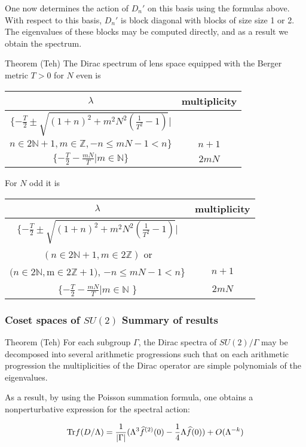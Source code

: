 \documentclass{beamer}
\def\N{{\mathbb N}}
\def\Z{{\mathbb Z}}
\def\Tr{{\rm Tr}}
\begin{document}
\begin{frame}
One now determines the action of $D_n'$ on this basis using the formulas above. With respect to this basis, $D_n'$ is block diagonal with blocks of size size 1 or 2. The eigenvalues of these blocks may be computed directly, and as a result we obtain the spectrum.
\end{frame}

\begin{frame}
\begin{block}{Theorem (Teh)}
	The Dirac spectrum of lens space equipped with the Berger metric $T>0$ for $N$ even is
	
	\begin{tabular}{|c|c|}
\hline
$\lambda$ & multiplicity\\
\hline
$\{ -\frac{T}{2} \pm  \sqrt{(1+n)^2 + m^2 N^2\left(\frac{1}{T^2} - 1 \right)} |$    & \\
$n \in 2\N +1, m\in \Z, -n \leq mN-1 < n \}$ & $n+1$\\
\hline
$\{ -\frac{T}{2} -\frac{mN}{T} | m \in \N \}$ & $2mN$ \\
\hline
\end{tabular}

For $N$ odd it is
\begin{tabular}{|c|c|}
\hline
$\lambda$ & multiplicity\\
\hline
$\{ -\frac{T}{2} \pm  \sqrt{(1+n)^2 + m^2 N^2\left(\frac{1}{T^2} - 1 \right)}|$ & \\ $(n \in 2 \N +1, m \in 2\Z)$ \rm{or}  & \\$(n \in 2\N, $m$ \in 2\Z + 1)$, $-n \leq mN-1 < n \}$  &$ n+1$\\
\hline
$\{ -\frac{T}{2} -\frac{mN}{T}| m \in \N$ \}  & $2mN$ \\
\hline
\end{tabular}
\end{block} 
\end{frame}

\begin{frame}
  \frametitle{Coset spaces of $SU(2)$ Summary of results}
  \begin{block}{Theorem (Teh)}
    For each subgroup $\Gamma$, the Dirac spectra of $SU(2) / \Gamma$ may be decomposed into several arithmetic progressions such that on each arithmetic progression the multiplicities of the Dirac operator are simple polynomials of the eigenvalues.
  \end{block}

  As a result, by using the Poisson summation formula, one obtains a nonperturbative expression for the spectral action:

  \[
  \Tr f(D/\Lambda) = \frac{1}{|\Gamma|}(\Lambda^3 \widehat{f}^{(2)}(0) -\frac{1}{4} \Lambda \widehat{f}(0)) + O(\Lambda^{-k})
  \]
\end{frame}
\end{document}
